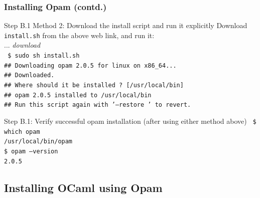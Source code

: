 \documentclass[aspectratio=169]{beamer}
\newcommand{\hm}{\hspace*{1em}}
\newcommand{\scripttt}{\scriptsize\tt}
\begin{document}
\begin{frame}
  \frametitle{Installing Opam (contd.)}

  \begin{block}{Step B.1 Method 2: Download the install script and run it explicitly}
    Download {\tt install.sh} from the above web link, and run it: \\
    {\scriptsize
      \hm{}{\tt \$} ... \emph{download} \hm {\tt https://raw.githubusercontent.com/ocaml/opam/master/shell/install.sh}} \\
    {\scripttt
      \hm{}\$ sudo sh install.sh \\
      \hm{}\#\# Downloading opam 2.0.5 for linux on x86\_64... \\
      \hm{}\#\# Downloaded. \\
      \hm{}\#\# Where should it be installed ? [/usr/local/bin] \\
      \hm{}\#\# opam 2.0.5 installed to /usr/local/bin \\
      \hm{}\#\# Run this script again with '--restore ' to revert.}
  \end{block}

  \begin{block}{Step B.1: Verify successful opam installation (after using either method above)}
    {\scripttt
      \hm{}\$ which opam \\
      \hm{}/usr/local/bin/opam \\
      \hm{}\$ opam --version \\
      \hm{}2.0.5 }
  \end{block}

\end{frame}


\subsection{Installing OCaml using Opam}
\end{document}
